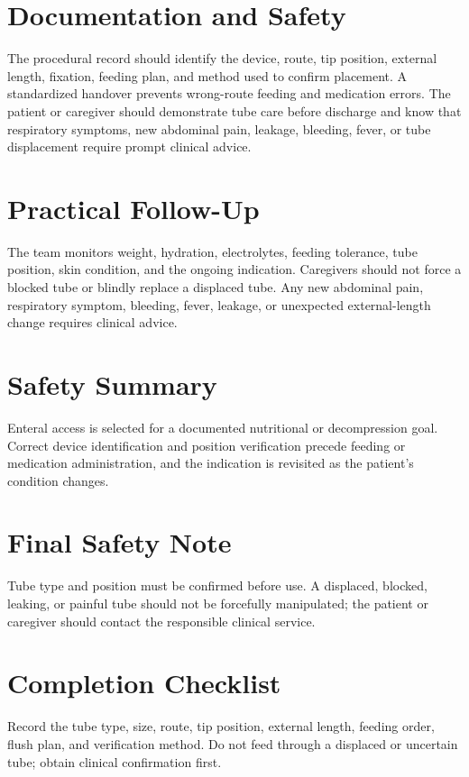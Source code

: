 \section*{Documentation and Safety}
The procedural record should identify the device, route, tip position, external length, fixation, feeding plan, and method used to confirm placement. A standardized handover prevents wrong-route feeding and medication errors. The patient or caregiver should demonstrate tube care before discharge and know that respiratory symptoms, new abdominal pain, leakage, bleeding, fever, or tube displacement require prompt clinical advice.

\section*{Practical Follow-Up}
The team monitors weight, hydration, electrolytes, feeding tolerance, tube position, skin condition, and the ongoing indication. Caregivers should not force a blocked tube or blindly replace a displaced tube. Any new abdominal pain, respiratory symptom, bleeding, fever, leakage, or unexpected external-length change requires clinical advice.

\section*{Safety Summary}
Enteral access is selected for a documented nutritional or decompression goal. Correct device identification and position verification precede feeding or medication administration, and the indication is revisited as the patient's condition changes.

\section*{Final Safety Note}
Tube type and position must be confirmed before use. A displaced, blocked, leaking, or painful tube should not be forcefully manipulated; the patient or caregiver should contact the responsible clinical service.

\section*{Completion Checklist}
Record the tube type, size, route, tip position, external length, feeding order, flush plan, and verification method. Do not feed through a displaced or uncertain tube; obtain clinical confirmation first.

